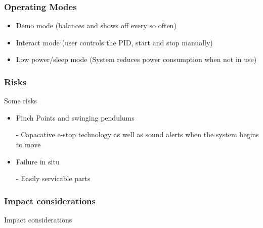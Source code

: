 \documentclass{beamer}
\begin{document}
\begin{frame}
\frametitle{Operating Modes}

\begin{itemize}
 \item Demo mode (balances and shows off every so often)
 \item Interact mode (user controls the PID, start and stop manually)
 \item Low power/sleep mode (System reduces power consumption when not in use)
\end{itemize}

\end{frame}


\begin{frame}
\frametitle{Risks}

Some risks

\begin{itemize}
 \item Pinch Points and swinging pendulums
 \item [-] Capacative e-stop technology as well as sound alerts when the system begins to move
 \item Failure in situ
 \item [-] Easily servicable parts
\end{itemize}

\end{frame}


\begin{frame}
\frametitle{Impact considerations}

Impact considerations

\end{frame}
\end{document}
